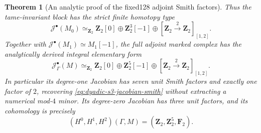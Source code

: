 \documentclass[11pt]{article}
\newtheorem{theorem}{Theorem}[section]
\theoremstyle{definition}
\begin{document}
\begin{theorem}[An analytic proof of the fixed128 adjoint Smith factors]
Thus the tame-invariant block has
the strict finite homotopy type
\begin{equation}\label{eq:dyadic-s3-tame-invariant-elementary}
\boxed{\quad
\mathcal J^\bullet(M_0)
\simeq_{\mathbf Z_2}
\mathbf Z_2[0]\oplus
\mathbf Z_2^3[-1]\oplus
[\mathbf Z_2\xrightarrow{2}
 \mathbf Z_2]_{[1,2]}.
\quad}
\end{equation}
Together with
$\mathcal J^\bullet(M_1)\simeq M_1[-1]$,
the full adjoint marked complex has
the \emph{analytically derived}
integral elementary form
\begin{equation}\label{eq:dyadic-s3-adjoint-elementary-from-tame}
\boxed{\quad
\mathcal J^\bullet_\Gamma(M)
\simeq_{\mathbf Z_2}
\mathbf Z_2[0]\oplus
\mathbf Z_2^5[-1]\oplus
[\mathbf Z_2\xrightarrow{2}
 \mathbf Z_2]_{[1,2]}.
\quad}
\end{equation}
In particular its degree-one
Jacobian has \emph{seven unit
Smith factors and exactly one
factor of $2$}, recovering
\eqref{eq:dyadic-s3-jacobian-smith}
without extracting a numerical
mod-$4$ minor.  Its degree-zero
Jacobian has three unit factors,
and its cohomology is precisely
\[
(H^0,H^1,H^2)(\Gamma,M)=
(\mathbf Z_2,\mathbf Z_2^5,\mathbf F_2).
\]
\end{theorem}
\end{document}
